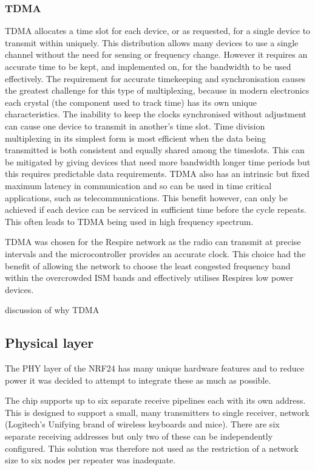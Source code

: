 \subsubsection{\acf{TDMA}}
\ac{TDMA} allocates a time slot for each device, or as requested, for a single device to transmit within
uniquely. This distribution allows many devices to use a single channel without the need for sensing
or frequency change. However it requires an accurate time to be kept, and implemented on, for the
bandwidth to be used effectively. The requirement for accurate timekeeping and synchronisation
causes the greatest challenge for this type of multiplexing, because in modern electronics each
crystal (the component used to track time) has its own unique characteristics. The inability to keep
the clocks synchronised without adjustment can cause one device to transmit in another's time slot.
Time division multiplexing in its simplest form is most efficient when the data being transmitted is
both consistent and equally shared among the timeslots. This can be mitigated by giving devices that
need more bandwidth longer time periods but this requires predictable data requirements.
\ac{TDMA} also has an intrinsic but fixed maximum latency in communication and so can be used in time
critical applications, such as telecommunications. This benefit however, can only be achieved if each
device can be serviced in sufficient time before the cycle repeats. This often leads to \ac{TDMA} being
used in high frequency spectrum.


\ac{TDMA} was chosen for the Respire network as the radio can transmit at precise intervals and the
microcontroller provides an accurate clock. This choice had the benefit of allowing the network to
choose the least congested frequency band within the overcrowded \ac{ISM} bands and effectively
utilises Respires low power devices.

{discussion of why TDMA}


\subsection{Physical layer}
The \acf{PHY} layer of the \ac{NRF24} has many unique hardware features and to reduce power
it was decided to attempt to integrate these as much as possible.


The chip supports up to six separate receive pipelines each with its own address. This is designed to
support a small, many transmitters to single receiver, network (\eg Logitech’s Unifying brand of
wireless keyboards and mice). There are six separate receiving addresses but only two of these can 
be independently configured. This solution was therefore not used as the restriction of a network
size to six nodes per repeater was inadequate.

